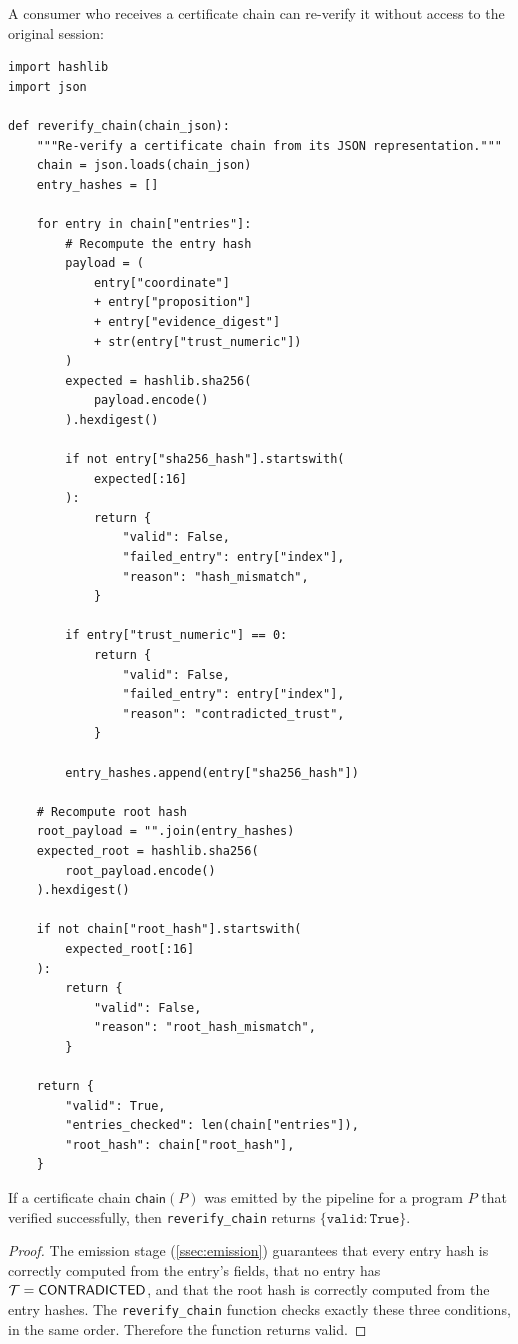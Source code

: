 \documentclass[11pt]{article}
\newcommand{\certchain}{\mathsf{chain}}
\begin{document}
A consumer who receives a certificate chain can re-verify it
without access to the original \JuGeo{} session:

\begin{lstlisting}[style=jugeo-python,caption={Re-verification protocol.}]
import hashlib
import json

def reverify_chain(chain_json):
    """Re-verify a certificate chain from its JSON representation."""
    chain = json.loads(chain_json)
    entry_hashes = []

    for entry in chain["entries"]:
        # Recompute the entry hash
        payload = (
            entry["coordinate"]
            + entry["proposition"]
            + entry["evidence_digest"]
            + str(entry["trust_numeric"])
        )
        expected = hashlib.sha256(
            payload.encode()
        ).hexdigest()

        if not entry["sha256_hash"].startswith(
            expected[:16]
        ):
            return {
                "valid": False,
                "failed_entry": entry["index"],
                "reason": "hash_mismatch",
            }

        if entry["trust_numeric"] == 0:
            return {
                "valid": False,
                "failed_entry": entry["index"],
                "reason": "contradicted_trust",
            }

        entry_hashes.append(entry["sha256_hash"])

    # Recompute root hash
    root_payload = "".join(entry_hashes)
    expected_root = hashlib.sha256(
        root_payload.encode()
    ).hexdigest()

    if not chain["root_hash"].startswith(
        expected_root[:16]
    ):
        return {
            "valid": False,
            "reason": "root_hash_mismatch",
        }

    return {
        "valid": True,
        "entries_checked": len(chain["entries"]),
        "root_hash": chain["root_hash"],
    }
\end{lstlisting}

\begin{theorem}\label{thm:reverify}
If a certificate chain $\certchain(P)$ was emitted by the \JuGeo{}
pipeline for a program $P$ that verified successfully, then
\texttt{reverify\_chain} returns $\{\texttt{valid}: \texttt{True}\}$.
\end{theorem}

\begin{proof}
The emission stage (\cref{ssec:emission}) guarantees that every entry
hash is correctly computed from the entry's fields, that no entry has
$\mathcal{T} = \mathsf{CONTRADICTED}$, and that the root hash is correctly computed from
the entry hashes.  The \texttt{reverify\_chain} function checks exactly
these three conditions, in the same order.  Therefore the function
returns valid.
\end{proof}
\end{document}
